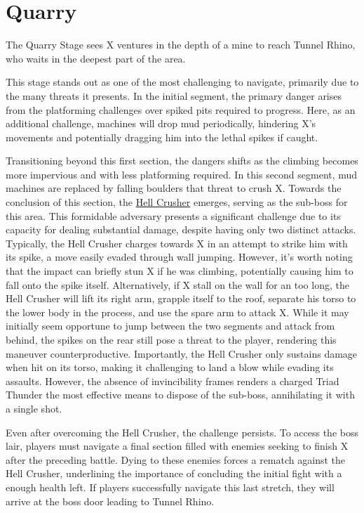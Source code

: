 \section{Quarry}
The Quarry Stage sees X ventures in the depth of a mine to reach Tunnel Rhino, who waits in the deepest part of the area.

This stage stands out as one of the most challenging to navigate, primarily due to the many threats it presents. In the initial segment, the primary danger arises from the platforming challenges over spiked pits required to progress. Here, as an additional challenge, machines will drop mud  periodically, hindering X's movements and potentially dragging him into the lethal spikes if caught.

Transitioning beyond this first section, the dangers shifts as the climbing becomes more impervious and with less platforming required. In this second segment, mud machines are replaced by falling boulders that threat to crush X. Towards the conclusion of this section, the \hyperlink{miniboss:Hell_Crusher}{Hell Crusher} emerges, serving as the sub-boss for this area. This formidable adversary presents a significant challenge due to its capacity for dealing substantial damage, despite having only two distinct attacks. Typically, the Hell Crusher charges towards X in an attempt to strike him with its spike, a move easily evaded through wall jumping. However, it's worth noting that the impact can briefly stun X if he was climbing, potentially causing him to fall onto the spike itself. Alternatively, if X stall on the wall for an too long, the Hell Crusher will lift its right arm, grapple itself to the roof, separate his torso to the lower body in the process, and use the spare arm to attack X. While it may initially seem opportune to jump between the two segments and attack from behind, the spikes on the rear still pose a threat to the player, rendering this maneuver counterproductive. Importantly, the Hell Crusher only sustains damage when hit on its torso, making it challenging to land a blow while evading its assaults. However, the absence of invincibility frames renders a charged Triad Thunder the most effective means to dispose of the sub-boss, annihilating it with a single shot.

Even after overcoming the Hell Crusher, the challenge persists. To access the boss lair, players must navigate a final section filled with enemies seeking to finish X after the preceding battle. Dying to these enemies forces a rematch against the Hell Crusher, underlining the importance of concluding the initial fight with a enough health left. If players successfully navigate this last stretch, they will arrive at the boss door leading to Tunnel Rhino.

